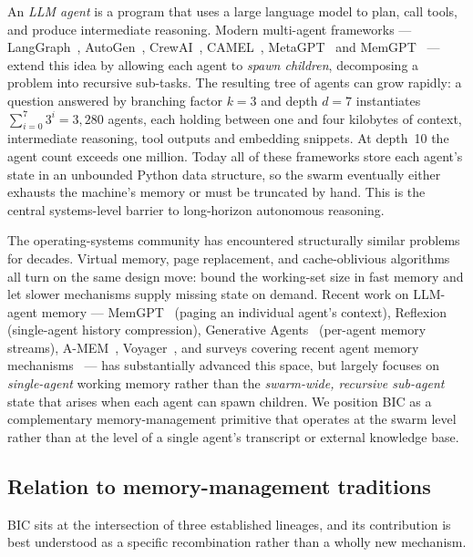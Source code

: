 \documentclass[fleqn,10pt]{article}
\theoremstyle{definition}
\begin{document}
An \emph{LLM agent} is a program that uses a large language model to
plan, call tools, and produce intermediate reasoning. Modern
multi-agent frameworks --- LangGraph~\citep{langgraph2024},
AutoGen~\citep{wu2023autogen}, CrewAI~\citep{crewai2024},
CAMEL~\citep{li2023camel}, MetaGPT~\citep{hong2023metagpt} and
MemGPT~\citep{packer2023memgpt} --- extend this idea by allowing each
agent to \emph{spawn children}, decomposing a problem into recursive
sub-tasks. The resulting tree of agents can grow rapidly:
a question answered by branching factor $k{=}3$ and depth $d{=}7$
instantiates
$\sum_{i=0}^{7} 3^i = 3{,}280$ agents, each holding between one and
four kilobytes of context, intermediate reasoning, tool outputs and
embedding snippets. At depth~10 the agent count exceeds one million.
Today all of these frameworks store each agent's state in an
unbounded Python data structure, so the swarm eventually either
exhausts the machine's memory or must be truncated by hand. This is
the central systems-level barrier to long-horizon autonomous
reasoning.

The operating-systems community has encountered structurally similar
problems for decades. Virtual memory, page replacement, and
cache-oblivious algorithms~\citep{belady1966study, denning1970working,
frigo1999cache, tanenbaum2014modernos} all turn on the same design
move: bound the working-set size in fast memory and let slower
mechanisms supply missing state on demand. Recent work on LLM-agent
memory --- MemGPT~\citep{packer2023memgpt} (paging an individual
agent's context), Reflexion~\citep{shinn2023reflexion} (single-agent
history compression), Generative Agents~\citep{park2023generative}
(per-agent memory streams), A-MEM~\citep{amem2025},
Voyager~\citep{wang2024voyager}, and surveys covering recent agent
memory mechanisms~\citep{zhang2024surveymemory, xi2024agentsurvey}
--- has substantially advanced this space, but largely focuses on
\emph{single-agent} working memory rather than the
\emph{swarm-wide, recursive sub-agent} state that arises when each
agent can spawn children. We position BIC as a complementary
memory-management primitive that operates at the swarm level
rather than at the level of a single agent's transcript or
external knowledge base.

\subsection*{Relation to memory-management traditions}

BIC sits at the intersection of three established lineages, and its
contribution is best understood as a specific recombination rather
than a wholly new mechanism.
\end{document}
